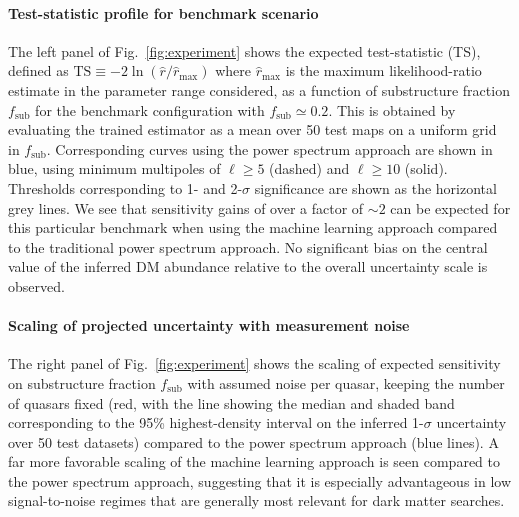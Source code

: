 \documentclass[preprint]{article}
\begin{document}
\paragraph{Test-statistic profile for benchmark scenario} The left panel of Fig.~\ref{fig:experiment} shows the expected test-statistic (TS), defined as $\mathrm{TS} \equiv -2\ln(\hat r / \hat r_\mathrm{max})$ where $\hat r_\mathrm{max}$ is the maximum likelihood-ratio estimate in the parameter range considered, as a function of substructure fraction $f_\mathrm{sub}$ for the benchmark configuration with $f_\mathrm{sub} \simeq 0.2$. This is obtained by evaluating the trained estimator as a mean over 50 test maps on a uniform grid in $f_\mathrm{sub}$. Corresponding curves using the power spectrum approach are shown in blue, using minimum multipoles of $\ell \geq 5$ (dashed) and $\ell \geq 10$ (solid). Thresholds corresponding to 1- and 2-$\sigma$ significance are shown as the horizontal grey lines. We see that sensitivity gains of over a factor of $\sim 2$ can be expected for this particular benchmark when using the machine learning approach compared to the traditional power spectrum approach. No significant bias on the central value of the inferred DM abundance relative to the overall uncertainty scale is observed.

\paragraph{Scaling of projected uncertainty with measurement noise} The right panel of Fig.~\ref{fig:experiment} shows the scaling of expected sensitivity on substructure fraction $f_\mathrm{sub}$ with assumed noise per quasar, keeping the number of quasars fixed (red, with the line showing the median and shaded band corresponding to the 95\% highest-density interval on the inferred 1-$\sigma$ uncertainty over 50 test datasets) compared to the power spectrum approach (blue lines). A far more favorable scaling of the machine learning approach is seen compared to the power spectrum approach, suggesting that it is especially advantageous in low signal-to-noise regimes that are generally most relevant for dark matter searches.
\end{document}
